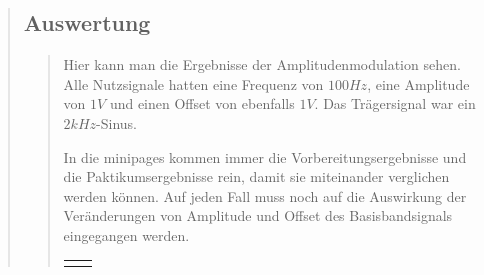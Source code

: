 \begin{quote}
\begin{quote}
    \end{quote}
    
    \subsection{Auswertung}
    \begin{quote}
        
        Hier kann man die Ergebnisse der Amplitudenmodulation sehen. Alle
        Nutzsignale hatten eine Frequenz von $100 Hz$, eine Amplitude von $1 V$
        und einen Offset von ebenfalls $1 V$. Das Trägersignal war ein $2
        kHz$-Sinus.
        
        In die minipages kommen immer die Vorbereitungsergebnisse und die
        Paktikumsergebnisse rein, damit sie miteinander verglichen werden
        können. Auf jeden Fall muss noch auf die Auswirkung der Veränderungen
        von Amplitude und Offset des Basisbandsignals eingegangen werden.
        
        
        \begin{center}
            \begin{tabular}{ll}

            \hspace{-14em}
                \begin{minipage}{0.6\textwidth}


\end{minipage}
\end{tabular}
\end{center}
\end{quote}
\end{quote}
